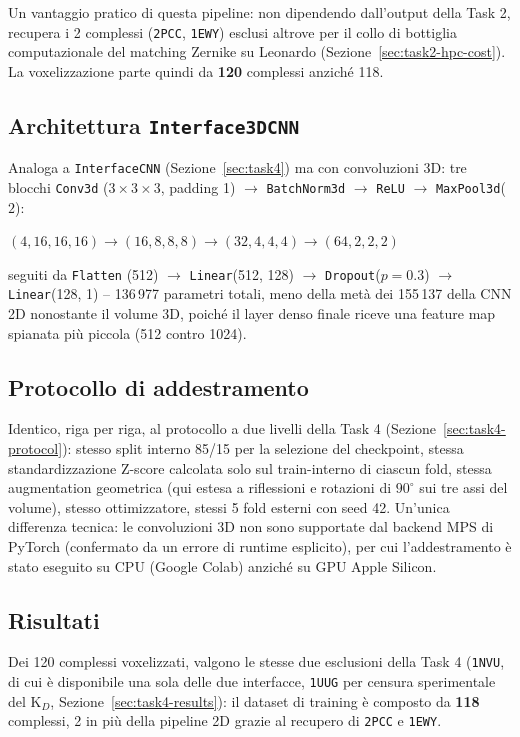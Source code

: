 \documentclass[11pt,a4paper]{article}
\begin{document}
Un vantaggio pratico di questa pipeline: non dipendendo dall'output della Task 2, recupera i 2 complessi (\texttt{2PCC}, \texttt{1EWY}) esclusi altrove per il collo di bottiglia computazionale del matching Zernike su Leonardo (Sezione~\ref{sec:task2-hpc-cost}). La voxelizzazione parte quindi da \textbf{120} complessi anziché 118.

\subsection{Architettura \texttt{Interface3DCNN}}
Analoga a \texttt{InterfaceCNN} (Sezione~\ref{sec:task4}) ma con convoluzioni 3D: tre blocchi \texttt{Conv3d} ($3\times3\times3$, padding 1) $\rightarrow$ \texttt{BatchNorm3d} $\rightarrow$ \texttt{ReLU} $\rightarrow$ \texttt{MaxPool3d}($2$):
\begin{center}
$(4,16,16,16) \rightarrow (16,8,8,8) \rightarrow (32,4,4,4) \rightarrow (64,2,2,2)$
\end{center}
seguiti da \texttt{Flatten} (512) $\rightarrow$ \texttt{Linear}(512, 128) $\rightarrow$ \texttt{Dropout}($p=0.3$) $\rightarrow$ \texttt{Linear}(128, 1) -- 136\,977 parametri totali, meno della metà dei 155\,137 della CNN 2D nonostante il volume 3D, poiché il layer denso finale riceve una feature map spianata più piccola (512 contro 1024).

\subsection{Protocollo di addestramento}
Identico, riga per riga, al protocollo a due livelli della Task 4 (Sezione~\ref{sec:task4-protocol}): stesso split interno 85/15 per la selezione del checkpoint, stessa standardizzazione Z-score calcolata solo sul train-interno di ciascun fold, stessa augmentation geometrica (qui estesa a riflessioni e rotazioni di $90^\circ$ sui tre assi del volume), stesso ottimizzatore, stessi 5 fold esterni con seed 42. Un'unica differenza tecnica: le convoluzioni 3D non sono supportate dal backend MPS di PyTorch (confermato da un errore di runtime esplicito), per cui l'addestramento è stato eseguito su CPU (Google Colab) anziché su GPU Apple Silicon.

\subsection{Risultati}
\label{sec:task4b-results}
Dei 120 complessi voxelizzati, valgono le stesse due esclusioni della Task 4 (\texttt{1NVU}, di cui è disponibile una sola delle due interfacce, \texttt{1UUG} per censura sperimentale del K$_D$, Sezione~\ref{sec:task4-results}): il dataset di training è composto da \textbf{118} complessi, 2 in più della pipeline 2D grazie al recupero di \texttt{2PCC} e \texttt{1EWY}.
\end{document}
